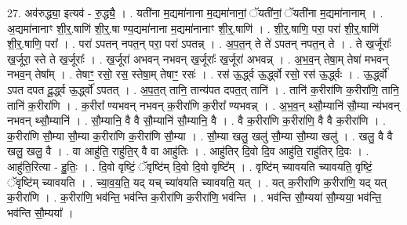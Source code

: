 \documentclass[17pt]{extarticle}
\begin{document}
27. अव॑रुद्ध्या॒ इत्यव॑ - रु॒द्ध्यै॒ । . यती॑ना म॒द्यमा॑नाना म॒द्यमा॑नानां॒ ॅयती॑नां॒ ॅयती॑ना म॒द्यमा॑नानाम् । . अ॒द्यमा॑नानाꣳ शी॒र्॒.षाणि॑ शी॒र्॒.षा ण्य॒द्यमा॑नाना म॒द्यमा॑नानाꣳ शी॒र्॒.षाणि॑ । . शी॒र्॒.षाणि॒ परा॒ परा॑ शी॒र्॒.षाणि॑ शी॒र्॒.षाणि॒ परा᳚ । . परा॑ ऽपतन् नपत॒न् परा॒ परा॑ ऽपतन्न् । . अ॒प॒त॒न् ते ते॑ ऽपतन् नपत॒न् ते । . ते ख॒र्जूराः᳚ ख॒र्जूरा॒ स्ते ते ख॒र्जूराः᳚ । . ख॒र्जूरा॑ अभवन् नभवन् ख॒र्जूराः᳚ ख॒र्जूरा॑ अभवन्न् । . अ॒भ॒व॒न् तेषा॒म् तेषा॑ मभवन् नभव॒न् तेषा᳚म् । . तेषाꣳ॒॒ रसो॒ रस॒ स्तेषा॒म् तेषाꣳ॒॒ रसः॑ । . रस॑ ऊ॒र्द्ध्व ऊ॒र्द्ध्वो रसो॒ रस॑ ऊ॒र्द्ध्वः । . ऊ॒र्द्ध्वो॑ ऽपत दपत दू॒र्द्ध्व ऊ॒र्द्ध्वो॑ ऽपतत् । . अ॒प॒त॒त् तानि॒ तान्य॑पत दपत॒त् तानि॑ । . तानि॑ क॒रीरा॑णि क॒रीरा॑णि॒ तानि॒ तानि॑ क॒रीरा॑णि । . क॒रीरा᳚ ण्यभवन् नभवन् क॒रीरा॑णि क॒रीरा᳚ ण्यभवन्न् । . अ॒भ॒व॒न् थ्सौ॒म्यानि॑ सौ॒म्या न्य॑भवन् नभवन् थ्सौ॒म्यानि॑ । . सौ॒म्यानि॒ वै वै सौ॒म्यानि॑ सौ॒म्यानि॒ वै । . वै क॒रीरा॑णि क॒रीरा॑णि॒ वै वै क॒रीरा॑णि । . क॒रीरा॑णि सौ॒म्या सौ॒म्या क॒रीरा॑णि क॒रीरा॑णि सौ॒म्या । . सौ॒म्या खलु॒ खलु॑ सौ॒म्या सौ॒म्या खलु॑ । . खलु॒ वै वै खलु॒ खलु॒ वै । . वा आहु॑ति॒ राहु॑ति॒र् वै वा आहु॑तिः । . आहु॑तिर् दि॒वो दि॒व आहु॑ति॒ राहु॑तिर् दि॒वः । . आहु॑ति॒रित्या - हु॒तिः॒ । . दि॒वो वृष्टिं॒ ॅवृष्टि॑म् दि॒वो दि॒वो वृष्टि᳚म् । . वृष्टि॑म् च्यावयति च्यावयति॒ वृष्टिं॒ ॅवृष्टि॑म् च्यावयति । . च्या॒व॒य॒ति॒ यद् यच् च्या॑वयति च्यावयति॒ यत् । . यत् क॒रीरा॑णि क॒रीरा॑णि॒ यद् यत् क॒रीरा॑णि । . क॒रीरा॑णि॒ भव॑न्ति॒ भव॑न्ति क॒रीरा॑णि क॒रीरा॑णि॒ भव॑न्ति । . भव॑न्ति सौ॒म्यया॑ सौ॒म्यया॒ भव॑न्ति॒ भव॑न्ति सौ॒म्यया᳚ । \newline
\end{document}
